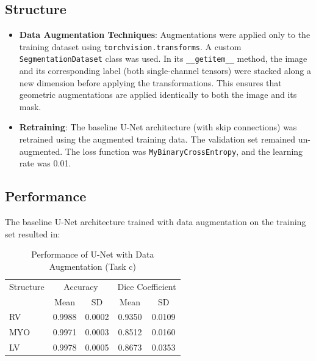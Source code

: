 \documentclass{article}
\begin{document}
\subsection{Structure}
\begin{itemize}
  \item \textbf{Data Augmentation Techniques}: Augmentations were applied only to the training dataset using
        \texttt{torchvision.transforms}. A custom \texttt{SegmentationDataset} class was used. In its \texttt{\_\_getitem\_\_} method,
        the image and its corresponding label (both single-channel tensors) were stacked along a new dimension before applying the
        transformations. This ensures that geometric augmentations are applied identically to both the image and its mask.
  \item \textbf{Retraining}: The baseline U-Net architecture (with skip connections) was retrained using the augmented training data.
        The validation set remained un-augmented. The loss function was \texttt{MyBinaryCrossEntropy}, and the learning rate was 0.01.
\end{itemize}

\subsection{Performance}
The baseline U-Net architecture trained with data augmentation on the training set resulted in:
\begin{table}[H]
  \centering
  \caption{Performance of U-Net with Data Augmentation (Task c)}
  \label{tab:data_aug_unet}
  \begin{tabular}{l|cc|cc}
    \toprule
    \multicolumn{1}{c|}{Structure} & \multicolumn{2}{c|}{Accuracy} & \multicolumn{2}{c}{Dice Coefficient}                   \\
                                   & Mean                          & SD                                   & Mean   & SD     \\
    \midrule
    RV                             & 0.9988                        & 0.0002                               & 0.9350 & 0.0109 \\
    MYO                            & 0.9971                        & 0.0003                               & 0.8512 & 0.0160 \\
    LV                             & 0.9978                        & 0.0005                               & 0.8673 & 0.0353 \\
    \bottomrule
  \end{tabular}
\end{table}
\end{document}
